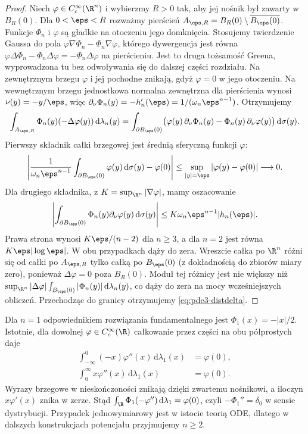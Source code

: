 \begin{proof}
Niech $\varphi\in C_c^\infty(\R^n)$ i wybierzmy $R>0$
tak, aby jej nośnik był zawarty w $B_R(0)$.
Dla $0<\eps<R$ rozważmy pierścień
$A_{\eps,R}=B_R(0)\setminus\overline{B_\eps(0)}$.
Funkcje $\Phi_n$ i $\varphi$ są gładkie na otoczeniu
jego domknięcia. Stosujemy twierdzenie Gaussa do pola
$\varphi\nabla\Phi_n-\Phi_n\nabla\varphi$,
którego dywergencja jest równa
$\varphi\Delta\Phi_n-\Phi_n\Delta\varphi
=-\Phi_n\Delta\varphi$ na pierścieniu.
Jest to druga tożsamość Greena, wyprowadzona tu
bez odwoływania się do dalszej części rozdziału.
Na zewnętrznym brzegu $\varphi$ i jej pochodne
znikają, gdyż $\varphi=0$ w jego otoczeniu.
Na wewnętrznym brzegu jednostkowa normalna zewnętrzna
dla pierścienia wynosi $\nu(y)=-y/\eps$,
więc $\partial_\nu\Phi_n(y)=-h_n'(\eps)
=1/(\omega_n\eps^{n-1})$.
Otrzymujemy
\[
 \int_{A_{\eps,R}}\Phi_n(y)(-\Delta\varphi(y))\,
 \mathrm d\lambda_n(y)
 =\int_{\partial B_\eps(0)}
 \bigl(\varphi(y)\,\partial_\nu\Phi_n(y)
       -\Phi_n(y)\,\partial_\nu\varphi(y)\bigr)\,\mathrm d\sigma(y).
\]
Pierwszy składnik całki brzegowej jest średnią
sferyczną funkcji $\varphi$:
\[
 \left|\frac1{\omega_n\eps^{n-1}}
 \int_{\partial B_\eps(0)}\varphi(y)\,\mathrm d\sigma(y)
 -\varphi(0)\right|
 \leq\sup_{|y|=\eps}|\varphi(y)-\varphi(0)|
 \longrightarrow0.
\]
Dla drugiego składnika, z $K=\sup_{\R^n}|\nabla\varphi|$,
mamy oszacowanie
\[
 \left|\int_{\partial B_\eps(0)}
 \Phi_n(y)\partial_\nu\varphi(y)\,\mathrm d\sigma(y)\right|
 \leq K\omega_n\eps^{n-1}|h_n(\eps)|.
\]
Prawa strona wynosi $K\eps/(n-2)$ dla $n\geq3$,
a dla $n=2$ jest równa $K\eps|\log\eps|$.
W obu przypadkach dąży do zera.
Wreszcie całka po $\R^n$ różni się od całki po
$A_{\eps,R}$ tylko całką po $B_\eps(0)$ (z dokładnością
do zbiorów miary zero), ponieważ $\Delta\varphi=0$
poza $B_R(0)$. Moduł tej różnicy jest nie większy niż
$\sup_{\R^n}|\Delta\varphi|
\int_{B_\eps(0)}|\Phi_n(y)|\,\mathrm d\lambda_n(y)$,
co dąży do zera na mocy wcześniejszych obliczeń.
Przechodząc do granicy otrzymujemy
\eqref{eq:pde3-distdelta}.
\end{proof}

\begin{uwaga}
Dla $n=1$ odpowiednikiem rozwiązania fundamentalnego
jest $\Phi_1(x)=-|x|/2$. Istotnie, dla dowolnej
$\varphi\in C_c^\infty(\R)$ całkowanie przez części
na obu półprostych daje
\[
 \begin{aligned}
 \int_{-\infty}^0(-x)\varphi''(x)\,\mathrm d\lambda_1(x)
 &=\varphi(0),\\
 \int_0^\infty x\varphi''(x)\,\mathrm d\lambda_1(x)
 &=\varphi(0).
 \end{aligned}
\]
Wyrazy brzegowe w nieskończoności znikają dzięki
zwartemu nośnikowi, a iloczyn $x\varphi'(x)$ znika
w zerze. Stąd $\int_\R \Phi_1(-\varphi'')\,
\mathrm d\lambda_1=\varphi(0)$, czyli
$-\Phi_1''=\delta_0$ w sensie dystrybucji.
Przypadek jednowymiarowy jest w istocie teorią ODE,
dlatego w dalszych konstrukcjach potencjału przyjmujemy $n\geq2$.
\end{uwaga}

